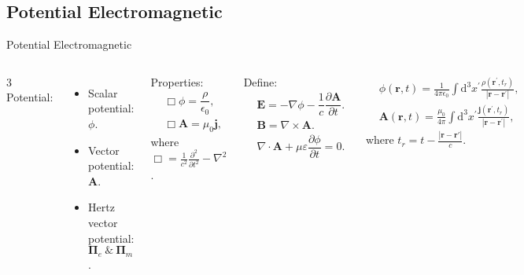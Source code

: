 \subsection{Potential Electromagnetic}

\begin{frame}{Potential Electromagnetic}
    \begin{columns}
        3 Potential:
        \begin{itemize}
            \item Scalar potential: \( \phi \).
            \item Vector potential: \( \mathbf{A} \).
            \item Hertz vector potential: \( \mathbf{\Pi}_e \ \& \ \mathbf{\Pi}_m\).
        \end{itemize}

        Properties:
        \begin{align*}
            &\Box \phi = \dfrac{\rho}{\epsilon_0}, \\
            &\Box \mathbf{A} = \mu_0 \mathbf{j},
        \end{align*}
        where \( \Box = \frac{1}{c^2} \frac{\partial^2}{\partial t^2} - \nabla^2 \).
        

        Define:
        \vspace{-4mm}
        \begin{align*}
            & \mathbf{E} = - \nabla \phi - \dfrac{1}{c} \dfrac{\partial \mathbf{A}}{\partial t}. \\
            & \mathbf{B} = \nabla \times \mathbf{A}. \\
            & \nabla \cdot \mathbf{A} + \mu \varepsilon \dfrac{\partial \phi}{\partial t} = 0.
        \end{align*}

        \begin{align*}
            & \phi (\mathbf{r}, t) = \frac{1}{4 \pi \epsilon_0} \int \mathrm{d}^3 x^\prime \frac{\rho\left( \mathbf{r}^\prime, t_r\right)}{ \left| \mathbf{r} - \mathbf{r}^\prime \right|}, \\
            & \mathbf A (\mathbf{r}, t) = \frac{\mu_0}{4 \pi} \int \mathrm{d}^3 x^\prime \frac{\mathbf{j}\left( \mathbf{r}^\prime, t_r\right)}{ \left| \mathbf{r} - \mathbf{r}^\prime \right|},
        \end{align*}
        where \( t_r = t - \frac{\left|\mathbf{r} - \mathbf{r}'\right|}{c} \).
    \end{columns}


\end{frame}